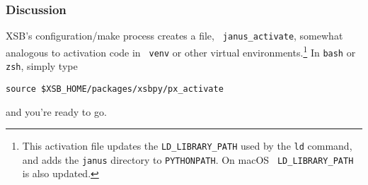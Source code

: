 
%

\subsubsection{Discussion}
XSB's configuration/make process creates a file, {\tt
  janus\_activate}, somewhat analogous to activation code in {\tt
  venv} or other virtual environments.\footnote{This activation file
updates the {\tt LD\_LIBRARY\_PATH} used by the {\tt ld} command, and
adds the {\tt janus} directory to {\tt PYTHONPATH}.  On macOS {\tt
  LD\_LIBRARY\_PATH} is also updated.} In {\tt bash} or {\tt zsh},
simply type
\begin{verbatim}
source $XSB_HOME/packages/xsbpy/px_activate
\end{verbatim}
and you're ready to go.

